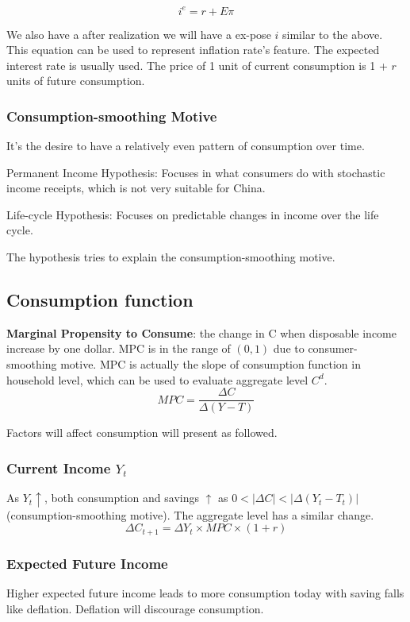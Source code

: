 \documentclass[10pt, a4paper]{article}
\begin{document}
            $$i^e = r + E\pi$$

            We also have a after realization we will have a ex-pose $i$ similar to the above. This equation can be used to represent inflation rate's feature. The expected interest rate is usually used. The price of 1 unit of current consumption is 1 + $r$ units of future consumption. 
            
            \subsubsection{Consumption-smoothing Motive}
                It's the desire to have a relatively even pattern of consumption over time. 

                Permanent Income Hypothesis: Focuses in what consumers do with stochastic income receipts, which is not very suitable for China. 

                Life-cycle Hypothesis: Focuses on predictable changes in income over the life cycle. 

                The hypothesis  tries to explain the consumption-smoothing motive. 

            
            \subsection{Consumption function}

                \textbf{Marginal Propensity to Consume}: the change in C when disposable income increase by one dollar. MPC is in the range of $(0, 1)$ due to consumer-smoothing motive. MPC is actually the slope of consumption function in household level, which can be used to evaluate aggregate level $C^d$.
                $$MPC = \frac{\Delta C}{\Delta (Y - T)}$$

                Factors will affect consumption will present as followed. 

                \subsubsection{Current Income $Y_t$}
                    As $Y_t \uparrow$, both consumption and savings $\uparrow$ as $0 < |\Delta C| < |\Delta (Y_t - T_t)|$ (consumption-smoothing motive).  The aggregate level has a similar change. 
                    $$\Delta C_{t + 1} = \Delta Y_t \times MPC \times (1 + r)$$

                \subsubsection{Expected Future Income}
                    Higher expected future income leads to more consumption today with saving falls like deflation.  Deflation will discourage consumption.  
\end{document}
